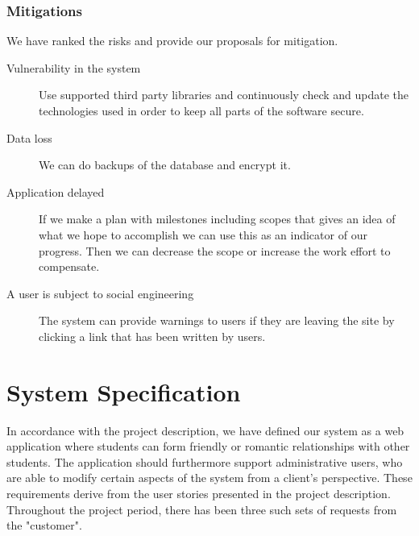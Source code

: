 \documentclass[a4paper]{article}
\begin{document}
\subsubsection{Mitigations}
We have ranked the risks and provide our proposals for mitigation.
\begin{description}
\item[Vulnerability in the system]
Use supported third party libraries and continuously check and update the technologies used in order to keep all parts of the software secure.



\item[Data loss]
We can do backups of the database and encrypt it.

\item[Application delayed]
If we make a plan with milestones including scopes that gives an idea of what we hope to accomplish we can use this as an indicator of our progress.
Then we can decrease the scope or increase the work effort to compensate.

\item[A user is subject to social engineering]
The system can provide warnings to users if they are leaving the site by clicking a link that has been written by users.

\end{description}


\section{System Specification}\label{sec:specification}
In accordance with the project description, we have defined our system as a web application where students can form friendly or romantic relationships with other students. The application should furthermore support administrative users, who are able to modify certain aspects of the system from a client's perspective. These requirements derive from the user stories presented in the project description. Throughout the project period, there has been three such sets of requests from the "customer".
\end{document}
